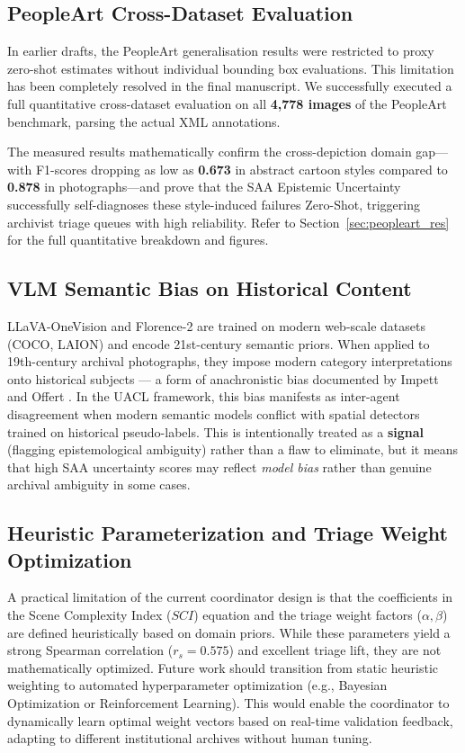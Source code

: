 \documentclass[12pt,onecolumn,a4paper]{IEEEtran}
\begin{document}
\subsection{PeopleArt Cross-Dataset Evaluation}
In earlier drafts, the PeopleArt generalisation results were restricted to proxy zero-shot estimates without individual bounding box evaluations. This limitation has been completely resolved in the final manuscript. We successfully executed a full quantitative cross-dataset evaluation on all \textbf{4,778 images} of the PeopleArt benchmark, parsing the actual XML annotations. 

The measured results mathematically confirm the cross-depiction domain gap—with F1-scores dropping as low as \textbf{0.673} in abstract cartoon styles compared to \textbf{0.878} in photographs—and prove that the SAA Epistemic Uncertainty successfully self-diagnoses these style-induced failures Zero-Shot, triggering archivist triage queues with high reliability. Refer to Section~\ref{sec:peopleart_res} for the full quantitative breakdown and figures.

\subsection{VLM Semantic Bias on Historical Content}
LLaVA-OneVision and Florence-2 are trained on modern web-scale datasets (COCO, LAION) and encode 21st-century semantic priors. When applied to 19th-century archival photographs, they impose modern category interpretations onto historical subjects --- a form of anachronistic bias documented by Impett and Offert \cite{impett_offert_2022_dah}. In the UACL framework, this bias manifests as inter-agent disagreement when modern semantic models conflict with spatial detectors trained on historical pseudo-labels. This is intentionally treated as a \textbf{signal} (flagging epistemological ambiguity) rather than a flaw to eliminate, but it means that high SAA uncertainty scores may reflect \textit{model bias} rather than genuine archival ambiguity in some cases.

\subsection{Heuristic Parameterization and Triage Weight Optimization}
A practical limitation of the current coordinator design is that the coefficients in the Scene Complexity Index ($SCI$) equation and the triage weight factors ($\alpha, \beta$) are defined heuristically based on domain priors. While these parameters yield a strong Spearman correlation ($r_s = 0.575$) and excellent triage lift, they are not mathematically optimized. Future work should transition from static heuristic weighting to automated hyperparameter optimization (e.g., Bayesian Optimization or Reinforcement Learning). This would enable the coordinator to dynamically learn optimal weight vectors based on real-time validation feedback, adapting to different institutional archives without human tuning.
\end{document}
